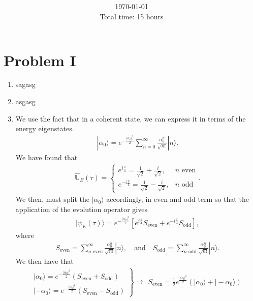 \documentclass[letterpaper,11pt,twoside]{article}
\title{\textbf{\assignment}\\\course\\{\Large\institution}}
\author{\autor}
\date{\today\\Total time: 15 hours}
\newcommand{\ket}[1]{|#1\rangle}
\begin{document}
\pagestyle{mainstyle}
\maketitle
\section*{Problem I}
\begin{enumerate}[itemsep=0pt,topsep=0pt,label=\alph*)]
  \item sagasg
  \item asgasg
  \item We use the fact that in a coherent state, we can express it in terms of the energy eigenstates.
  \begin{align*}
    \ket{\alpha_0}=e^{-\frac{|\alpha_0|^2}{2}}\sum_{n=0}^\infty\frac{\alpha_0^n}{\sqrt{n!}}\ket{n}.
  \end{align*}
  We have found that 
  \begin{align*}
    \hat{\mathbb{U}}_E(\tau)=\begin{cases}
      e^{i\frac{\pi}{4}}=\frac{1}{\sqrt{2}}+\frac{i}{\sqrt{2}},&\text{$n$ even}\\
      e^{-i\frac{\pi}{4}}=\frac{1}{\sqrt{2}}-\frac{i}{\sqrt{2}},&\text{$n$ odd}
    \end{cases}.
  \end{align*}
  We then, must split the $\ket{\alpha_0}$ accordingly, in even and odd term so that the application of the evolution operator gives
  \begin{align*}
    \ket{\psi_E(\tau)}=e^{-\frac{|\alpha_0|^2}{2}}\left[e^{i\frac{\pi}{4}}S_{\text{even}}+e^{-i\frac{\pi}{4}}S_{\text{odd}}\right],
  \end{align*}
  where 
  \begin{align}
    S_{\text{even}}=\sum_{\text{$n$ even}}^\infty\frac{\alpha_0^n}{\sqrt{n!}}\ket{n},\quad\text{and}\quad S_{\text{odd}}=\sum_{\text{$n$ odd}}^\infty\frac{\alpha_0^n}{\sqrt{n!}}\ket{n}.
  \end{align}
  We then have that 
  \begin{align*}
    \left.\begin{array}{l}
      \ket{\alpha_0}=e^{-\frac{|\alpha_0|^2}{2}}(S_{\text{even}}+S_{\text{odd}})\\
      \ket{-\alpha_0}=e^{-\frac{|\alpha_0|^2}{2}}(S_{\text{even}}-S_{\text{odd}})      
    \end{array}\right\}\longrightarrow\begin{array}{l}
      S_{\text{even}}=\frac{1}{2}e^{\frac{|\alpha_0|^2}{2}}(\ket{\alpha_0}+\ket{-\alpha_0})\\

\end{array}
\end{align*}
\end{enumerate}
\end{document}
